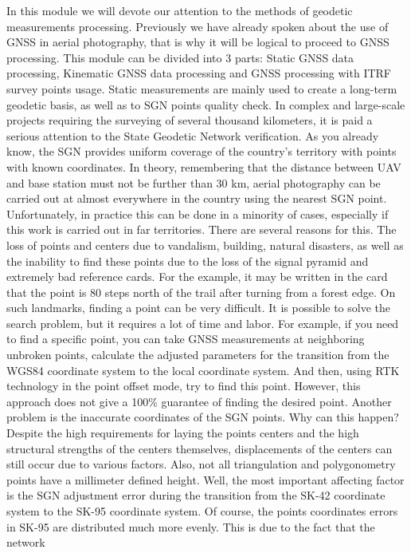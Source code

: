 \documentclass[
  letterpaper,
  DIV=11,
  numbers=noendperiod]{scrreprt}
\begin{document}
In this module we will devote our attention to the methods of geodetic
measurements processing. Previously we have already spoken about the use
of GNSS in aerial photography, that is why it will be logical to proceed
to GNSS processing. This module can be divided into 3 parts: Static GNSS
data processing, Kinematic GNSS data processing and GNSS processing with
ITRF survey points usage. Static measurements are mainly used to create
a long-term geodetic basis, as well as to SGN points quality check. In
complex and large-scale projects requiring the surveying of several
thousand kilometers, it is paid a serious attention to the State
Geodetic Network verification. As you already know, the SGN provides
uniform coverage of the country's territory with points with known
coordinates. In theory, remembering that the distance between UAV and
base station must not be further than 30 km, aerial photography can be
carried out at almost everywhere in the country using the nearest SGN
point. Unfortunately, in practice this can be done in a minority of
cases, especially if this work is carried out in far territories. There
are several reasons for this. The loss of points and centers due to
vandalism, building, natural disasters, as well as the inability to find
these points due to the loss of the signal pyramid and extremely bad
reference cards. For the example, it may be written in the card that the
point is 80 steps north of the trail after turning from a forest edge.
On such landmarks, finding a point can be very difficult. It is possible
to solve the search problem, but it requires a lot of time and labor.
For example, if you need to find a specific point, you can take GNSS
measurements at neighboring unbroken points, calculate the adjusted
parameters for the transition from the WGS84 coordinate system to the
local coordinate system. And then, using RTK technology in the point
offset mode, try to find this point. However, this approach does not
give a 100\% guarantee of finding the desired point. Another problem is
the inaccurate coordinates of the SGN points. Why can this happen?
Despite the high requirements for laying the points centers and the high
structural strengths of the centers themselves, displacements of the
centers can still occur due to various factors. Also, not all
triangulation and polygonometry points have a millimeter defined height.
Well, the most important affecting factor is the SGN adjustment error
during the transition from the SK-42 coordinate system to the SK-95
coordinate system. Of course, the points coordinates errors in SK-95 are
distributed much more evenly. This is due to the fact that the network
\end{document}

